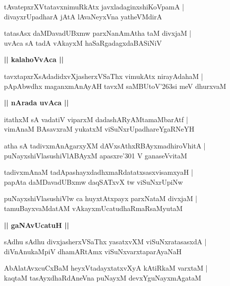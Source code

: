 \documentclass[twoside,12pt,openright]{book}
\def\S{\char'263}
\newcounter{shloka}[chapter]
\def\uvaca#1{\centerline{{\large\textbf{#1}}}}
\begin{document}
\begin{shloka}%
tAvatepxrXVtatavxnimuRkAtx javxladaginxshiKoVpamA |\\
divayxrUpadharA jAtA lAvaNeyxVna yatheVMdirA 
\end{shloka}

\begin{shloka}%
tatasAsx daMDavadUBxmw parxNanAmAtha taM divxjaM |\\
uvAca sA tadA vAkayxM haSaRgadagxdaBASiNiV 
\end{shloka}

\uvaca{|| kalahoVvAca ||}

\begin{shloka}%
tavxtapxrXsAdadidxvXjasherxVSaThx vimukAtx nirayAdahaM |\\
pApAbwdhx maganxmAnAyAH tavxM saMBUtoV\S si meV dhurxvaM 
\end{shloka}

\uvaca{|| nArada uvAca ||}

\begin{shloka}%
itathxM sA vadatiV viparxM dadashARyAMtamaMbarAtf |\\
vimAnaM BAsavxraM yukatxM viSuNxrUpadhareYgaRNeYH 
\end{shloka}

\begin{shloka}%
atha sA tadivxmAnAgarxyXM dAVxsAthxRBAyxmadhiroVhitA |\\
puNayxshiVlasushiVlABAyxM apasxre\char'301 V ganaseVvitaM 
\end{shloka}

\begin{shloka}%
tadivxmAnaM tadApashayxdadhxmaRdatatxsasxvisamxyaH |\\
papAta daMDavadUBxmw daqSATxvX tw viSuNxrUpiNw
\end{shloka}

\begin{shloka}%
puNayxshiVlasushiVlw ca huyxtAtxpayx parxNataM divxjaM |\\
tamuBayxvaMdatAM vAkayxmUcatudhaRmaRsaMyutaM
\end{shloka}

\uvaca{|| gaNAvUcatuH ||}

\begin{shloka}%
sAdhu sAdhu divxjasherxVSaThx yasatxvXM viSuNxratasasxdA |\\
diVnAnukaMpiV dhamARtAmx viSuNxvarxtaparAyaNaH 
\end{shloka}

\begin{shloka}%
AbAlatAvxcuCxBaM heyxVtadayxtatxvXyA kAtiRkaM varxtaM |\\
kaqtaM tasAyxdhaRdAneVna puNayxM devxYguNayxmAgataM 
\end{shloka}
\end{document}
